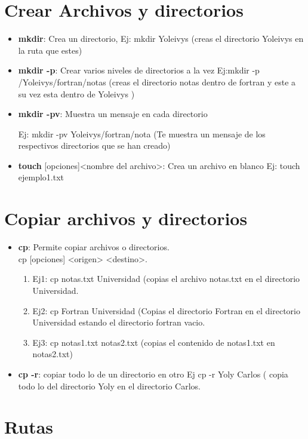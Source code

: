 \documentclass[12pt,a4paper]{article}
\begin{document}
\section{Crear Archivos y directorios}
\begin{itemize}
\item \textbf{mkdir}: Crea un directorio, Ej: mkdir Yoleivys (creas el directorio Yoleivys en la ruta que estes)
\item \textbf{mkdir -p}: Crear varios niveles de directorios a la vez Ej:mkdir -p /Yoleivys/fortran/notas (creas el directorio notas  dentro de fortran y este a su vez esta dentro de Yoleivys )
\item \textbf{mkdir -pv}: Muestra un mensaje en cada directorio 

Ej: mkdir -pv Yoleivys/fortran/nota (Te muestra un mensaje de los respectivos directorios que se han creado)
\item \textbf{touch} [opciones]<nombre del archivo>: Crea un archivo en blanco Ej: touch ejemplo1.txt
\end{itemize}

\section{Copiar archivos y directorios}
\begin{itemize}
\item \textbf{cp}: Permite copiar archivos o directorios.\\ cp [opciones] <origen> <destino>.
\begin{enumerate}
\item Ej1: cp notas.txt Universidad (copias el archivo notas.txt en el directorio Universidad.\\
\item Ej2: cp Fortran Universidad (Copias el directorio Fortran  en el directorio Universidad estando el directorio fortran vacio.\\
\item Ej3: cp notas1.txt notas2.txt (copias el contenido de notas1.txt en notas2.txt)
\end{enumerate}
\item \textbf{cp -r}: copiar todo lo de un directorio en otro Ej cp -r Yoly Carlos ( copia todo lo del directorio Yoly en el directorio Carlos.
\end{itemize}

\section{Rutas}
\end{document}

